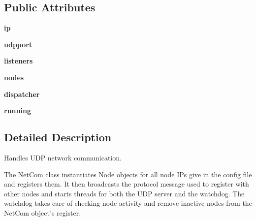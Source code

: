 \subsection*{Public Attributes}
\begin{DoxyCompactItemize}
\item 
{\bfseries ip}\hypertarget{classracecontrol_1_1netcom_1_1NetCom_a655c019f1760dc2aeac17059daa9003e}{}\label{classracecontrol_1_1netcom_1_1NetCom_a655c019f1760dc2aeac17059daa9003e}

\item 
{\bfseries udpport}\hypertarget{classracecontrol_1_1netcom_1_1NetCom_ab1de996cc0fbaa07ff432eb49111220a}{}\label{classracecontrol_1_1netcom_1_1NetCom_ab1de996cc0fbaa07ff432eb49111220a}

\item 
{\bfseries listeners}\hypertarget{classracecontrol_1_1netcom_1_1NetCom_af65e46142c5376a0e20642b064daf791}{}\label{classracecontrol_1_1netcom_1_1NetCom_af65e46142c5376a0e20642b064daf791}

\item 
{\bfseries nodes}\hypertarget{classracecontrol_1_1netcom_1_1NetCom_ab7425c0021edb0748e364bed18b0bdbd}{}\label{classracecontrol_1_1netcom_1_1NetCom_ab7425c0021edb0748e364bed18b0bdbd}

\item 
{\bfseries dispatcher}\hypertarget{classracecontrol_1_1netcom_1_1NetCom_a7220c84e9eaf348fe1e11be8d29e2c7e}{}\label{classracecontrol_1_1netcom_1_1NetCom_a7220c84e9eaf348fe1e11be8d29e2c7e}

\item 
{\bfseries running}\hypertarget{classracecontrol_1_1netcom_1_1NetCom_aec956fd7586eccce58253004e0e77f83}{}\label{classracecontrol_1_1netcom_1_1NetCom_aec956fd7586eccce58253004e0e77f83}

\end{DoxyCompactItemize}


\subsection{Detailed Description}
\begin{DoxyVerb}Handles UDP network communication.

The NetCom class instantiates Node objects for all node IPs give in the
config file and registers them. It then broadcasts the protocol message
used to register with other nodes and starts threads for both the UDP
server and the watchdog. The watchdog takes care of checking node activity
and remove inactive nodes from the NetCom object's register.
\end{DoxyVerb}
 

